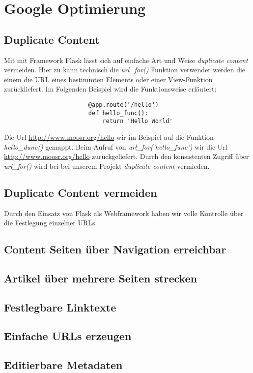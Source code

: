 \chapter{Google Optimierung}

\section{Duplicate Content}
Mit mit Framework Flask lässt sich auf einfache Art und Weise \emph{duplicate
content} vermeiden. Hier zu kann technisch die \emph{url\_for()} Funktion
verwendet werden die einem die URL eines bestimmten Elements oder einer
View-Funktion zurückliefert. Im Folgenden Beispiel wird die Funktionsweise
erläutert:

\begin{verbatim}
                        @app.route('/hello')
                        def hello_func():
                            return 'Hello World'
\end{verbatim}

Die Url \url{http://www.moosr.org/hello} wir im Beispiel auf die Funktion
\emph{hello\_dunc()} gemappt. Beim Aufruf von \emph{url\_for('hello\_func')} wir
die Url \url{http://www.moosr.org/hello} zurückgeliefert. Durch den konsistenten
Zugriff über \emph{url\_for()} wird bei bei unserem Projekt
\emph{duplicate content} vermieden.



\section{Duplicate Content vermeiden}
Durch den Einsatz von Flask als Webframework haben wir volle Kontrolle über
die Festlegung einzelner URLs. 
\section{Content Seiten über Navigation erreichbar}


\section{Artikel über mehrere Seiten strecken}
\section{Festlegbare Linktexte}
\section{Einfache URLs erzeugen}


\section{Editierbare Metadaten}

